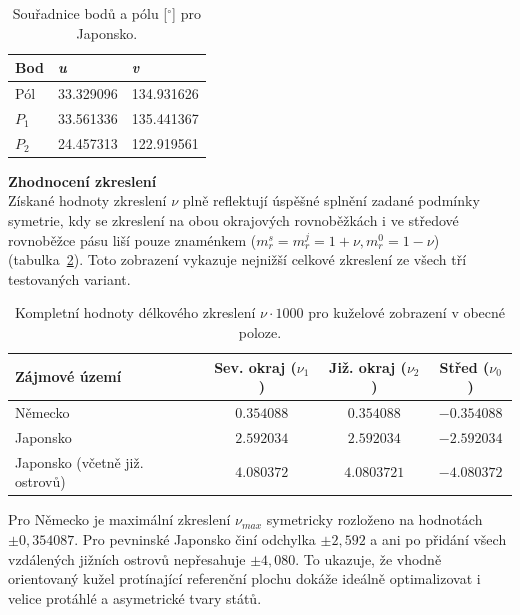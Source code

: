     \begin{table}[h!]
        \centering
        \begin{tabular}{|p{3cm}|p{3cm}|p{3cm}|} 
         \hline
            Bod & \textit{u}  & \textit{v} \\
            \hline
            Pól  &   33.329096  &  134.931626 \\
            \hline
            $P_1$   &  33.561336 &  135.441367 \\
            \hline
            $P_2$   &  24.457313 & 122.919561 \\
            \hline
    
        \end{tabular}
        \caption{Souřadnice bodů a pólu [$^\circ$] pro Japonsko.}
\label{table:6}
    \end{table}
\newpage
\textbf{Zhodnocení zkreslení} \\
Získané hodnoty zkreslení $\nu$  plně reflektují úspěšné splnění zadané podmínky symetrie, kdy se zkreslení na obou okrajových rovnoběžkách i ve středové rovnoběžce pásu liší pouze znaménkem ($m_r^s = m_r^j = 1 + \nu, m_r^0 = 1 - \nu$) (tabulka~\ref{tab_vsechna_zkresleni_kuzel}). Toto zobrazení vykazuje nejnižší celkové zkreslení ze všech tří testovaných variant. 
\begin{table}[h!]
	\centering
	\renewcommand{\arraystretch}{1.3}
	\begin{tabular}{|l|c|c|c|}
		\hline
		\textbf{Zájmové území} & \textbf{Sev. okraj ($\nu_1$)} & \textbf{Již. okraj ($\nu_2$)} & \textbf{Střed ($\nu_0$)} \\ \hline\hline
		Německo & $0.354088$ & $0.354088$ & $-0.354088$ \\ \hline
		Japonsko  & $2.592034$ & $2.592034$ & $-2.592034$ \\ \hline
		Japonsko (včetně již. ostrovů) & $4.080372$ & $4.0803721$ & $-4.080372$ \\ \hline
	\end{tabular}
	\vspace{0.2cm}
	\caption{Kompletní hodnoty délkového zkreslení $\nu \cdot 1000$ pro kuželové zobrazení v obecné poloze.}
	\label{tab_vsechna_zkresleni_kuzel}
\end{table}


Pro Německo je maximální zkreslení $\nu_{max}$ symetricky rozloženo na hodnotách  $\pm 0,354087$. Pro pevninské Japonsko činí odchylka $\pm 2,592$ a ani po přidání všech vzdálených jižních ostrovů nepřesahuje $\pm 4,080$. To ukazuje, že vhodně orientovaný kužel protínající referenční plochu dokáže ideálně optimalizovat i velice protáhlé a asymetrické tvary států.

